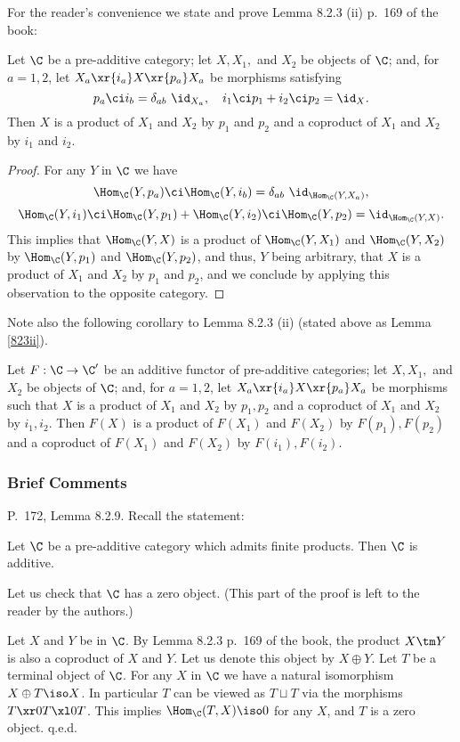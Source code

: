 \documentclass[12pt]{article}
\theoremstyle{remark}
\theoremstyle{definition}
\begin{document}
For the reader's convenience we state and prove Lemma 8.2.3 (ii) p.~169 of the book:

\begin{lem}[Lemma 8.2.3 (ii) p. 169]
Let $\C$ be a pre-additive category; let $X,X_1,$ and $X_2$ be objects of $\C$; and, for $a=1,2$, let $X_a\xr{i_a}X\xr{p_a}X_a$ be morphisms satisfying 
$$
p_a\ci i_b=\delta_{ab}\ \id_{X_a},\quad i_1\ci p_1+i_2\ci p_2=\id_X.
$$
Then $X$ is a product of $X_1$ and $X_2$ by $p_1$ and $p_2$ and a coproduct of $X_1$ and $X_2$ by $i_1$ and $i_2$. 
\end{lem}

\begin{proof}
For any $Y$ in $\C$ we have 
$$
\Hom_\C(Y,p_a)\ci\Hom_\C(Y,i_b)=\delta_{ab}\ \id_{\Hom_\C(Y,X_a)},
$$ 
$$
\Hom_\C(Y,i_1)\ci\Hom_\C(Y,p_1)+\Hom_\C(Y,i_2)\ci\Hom_\C(Y,p_2)=\id_{\Hom_\C(Y,X)}.
$$ 
This implies that $\Hom_\C(Y,X)$ is a product of $\Hom_\C(Y,X_1)$ and $\Hom_\C(Y,X_2)$ by $\Hom_\C(Y,p_1)$ and $\Hom_\C(Y,p_2)$, and thus, $Y$ being arbitrary, that $X$ is a product of $X_1$ and $X_2$ by $p_1$ and $p_2$, and we conclude by applying this observation to the opposite category.
\end{proof}

Note also the following corollary to Lemma 8.2.3 (ii) (stated above as Lemma \ref{823ii}). 

\begin{cor}
Let $F:\C\to\C'$ be an additive functor of pre-additive categories; let $X,X_1,$ and $X_2$ be objects of $\C$; and, for $a=1,2$, let $X_a\xr{i_a}X\xr{p_a}X_a$ be morphisms such that $X$ is a product of $X_1$ and $X_2$ by $p_1,p_2$ and a coproduct of $X_1$ and $X_2$ by $i_1,i_2$. Then $F(X)$ is a product of $F(X_1)$ and $F(X_2)$ by $F(p_1),F(p_2)$ and a coproduct of $F(X_1)$ and $F(X_2)$ by $F(i_1),F(i_2)$. 
\end{cor}


\subsubsection{Brief Comments}

\begin{s} 
P.~172, Lemma 8.2.9. Recall the statement:

\begin{lem}[Lemma 8.2.9 p. 172] 
Let $\C$ be a pre-additive category which admits finite products. Then $\C$ is additive.
\end{lem}

Let us check that $\C$ has a zero object. (This part of the proof is left to the reader by the authors.) 

Let $X$ and $Y$ be in $\C$. By Lemma 8.2.3 p.~169 of the book, the product $X\tm Y$ is also a coproduct of $X$ and $Y$. Let us denote this object by $X\oplus Y$. Let $T$ be a terminal object of $\C$. For any $X$ in $\C$ we have a natural isomorphism $X\oplus T\iso X$. In particular $T$ can be viewed as $T\sqcup T$ via the morphisms $T\xr0T\xl0T$. This implies $\Hom_\C(T,X)\iso0$ for any $X$, and $T$ is a zero object. q.e.d.
\end{s}
\end{document}

